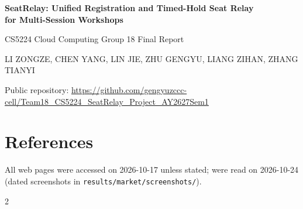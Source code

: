 \documentclass[a4paper,10pt]{article}
\newcommand{\memberNameOnly}[2]{#1}
\let\member\memberNameOnly
\newcommand{\code}[1]{\texttt{\smaller #1}}   %
\begin{document}
\begin{center}
{\LARGE\bfseries SeatRelay: Unified Registration and Timed-Hold Seat Relay\\[2pt] for Multi-Session Workshops\par}
\vspace{4pt}
{\large CS5224 Cloud Computing \textemdash{} Group 18 \textemdash{} Final Report\par}
\vspace{3pt}
{\small \member{LI ZONGZE}{\IdLiZongze}, \member{CHEN YANG}{\IdChenYang}, \member{LIN JIE}{\IdLinJie},
\member{ZHU GENGYU}{\IdZhuGengyu}, \member{LIANG ZIHAN}{\IdLiangZihan}, \member{ZHANG TIANYI}{\IdZhangTianyi}\par}
\vspace{2pt}
{\small Public repository: \url{https://github.com/gengyuzccc-cell/Team18_CS5224_SeatRelay_Project_AY2627Sem1}\par}
\end{center}
\vspace{-2pt}
\suppressfloats[t]









\section{References}\label{sec:refs}
{\scriptsize All web pages were accessed on 2026-10-17 unless stated; \cite{nus-osa-getstarted,sit-find-your-tribe,smu-student-experiences} were read on 2026-10-24 (dated screenshots in \code{results/market/screenshots/}).\par}
\begin{multicols}{2}
\printbibliography[heading=none]
\end{multicols}
\end{document}

